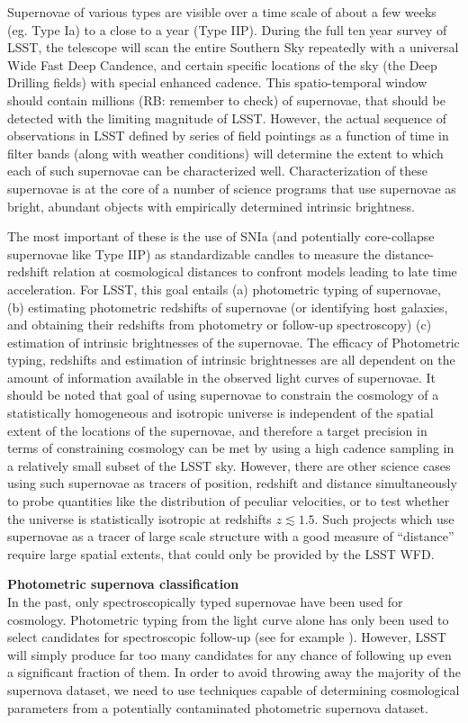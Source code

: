 Supernovae of various types are visible over a time scale of about a few weeks (eg. Type Ia) to a
 close to a year (Type IIP). During the full ten year survey of LSST, the
telescope will scan the entire Southern Sky repeatedly with a universal Wide Fast Deep
 Candence, and certain specific locations of the sky (the Deep Drilling fields)
with special enhanced cadence. This spatio-temporal window should contain
millions (RB: remember to check) of supernovae, that should be detected with the
 limiting magnitude of LSST. However, the actual sequence of observations in LSST
defined by series of field pointings as a function of time in filter bands
 (along with weather conditions) will determine the extent to which each of such
supernovae can be characterized well. Characterization of these supernovae is at
 the core of a number of science programs that use supernovae as bright, abundant
 objects with empirically determined intrinsic brightness.

The most important of these is the use of SNIa (and potentially core-collapse
supernovae like Type IIP) as standardizable candles to measure the
distance-redshift relation at cosmological distances to confront models leading to late time
 acceleration. For LSST, this goal entails (a) photometric typing of supernovae,
 (b) estimating photometric redshifts of supernovae (or identifying host galaxies,
 and obtaining their redshifts from photometry or follow-up spectroscopy)
(c) estimation of intrinsic brightnesses of the supernovae. The efficacy of
Photometric typing, redshifts and estimation of intrinsic brightnesses are all
dependent on the amount of information available in the observed light curves of supernovae.
 It should be noted that goal of using supernovae to constrain the
cosmology of a statistically homogeneous and isotropic universe is independent
of the spatial extent of the locations of the supernovae, and therefore a target
 precision in terms of constraining cosmology can be met by using a high cadence sampling
 in a relatively small subset of the LSST sky. However, there are other science cases
using such supernovae as tracers of position, redshift and distance simultaneously to probe
 quantities like the distribution of peculiar velocities, or to test whether the universe is
statistically isotropic at redshifts $z \lesssim 1.5$. Such projects which use supernovae as a 
tracer of large scale structure with a good measure of ``distance'' require large spatial extents, 
that could only be provided by the LSST WFD.

{\bfseries Photometric supernova classification}\\
In the past, only spectroscopically typed supernovae have been used for cosmology. Photometric 
typing from the light curve alone has only been used to select candidates for spectroscopic 
follow-up (see for example \citet{Sako2008}). However, LSST will simply produce far too many 
candidates for any chance of following up even a significant fraction of them. In order to avoid 
throwing away the majority of the supernova dataset, we need to use techniques capable of 
determining cosmological parameters from a potentially contaminated photometric supernova dataset.

